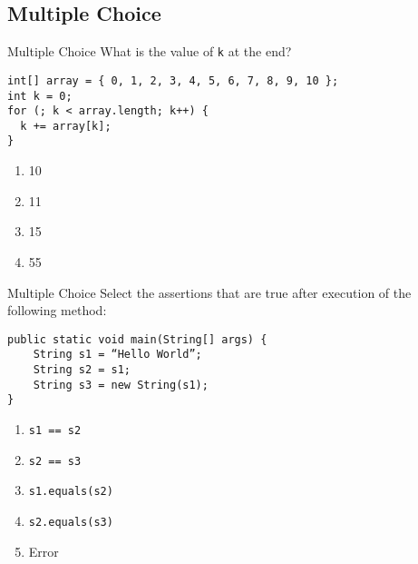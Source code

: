\documentclass[9pt]{beamer}
\begin{document}
\subsection{Multiple Choice}
\begin{frame}[fragile]{Multiple Choice}
  What is the value of {\tt k} at the end?

  \begin{lstlisting}
int[] array = { 0, 1, 2, 3, 4, 5, 6, 7, 8, 9, 10 };
int k = 0;
for (; k < array.length; k++) {
  k += array[k];
}
  \end{lstlisting}

  \begin{enumerate}
    \item
      10
    \item
      11
    \item
      \alert<2>{15}
    \item
      55
  \end{enumerate}
\end{frame}

\begin{frame}[fragile]{Multiple Choice}
  Select the assertions that are true after execution of the following method:

  \begin{lstlisting}
public static void main(String[] args) {
    String s1 = “Hello World”;
    String s2 = s1;
    String s3 = new String(s1);
}
  \end{lstlisting}

  \begin{enumerate}
    \item
      \alert<2>{{\tt s1 == s2}}
    \item
      {\tt s2 == s3}
    \item
      \alert<2>{{\tt s1.equals(s2)}}
    \item
      \alert<2>{{\tt s2.equals(s3)}}
    \item
      Error
  \end{enumerate}
\end{frame}
\end{document}
